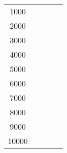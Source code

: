% 
\begin{tabular}{ccccc}
  \hline
  \hline
1000 &  &  &  &  \\ 
  2000 &  &  &  &  \\ 
  3000 &  &  &  &  \\ 
  4000 &  &  &  &  \\ 
  5000 &  &  &  &  \\ 
  6000 &  &  &  &  \\ 
  7000 &  &  &  &  \\ 
  8000 &  &  &  &  \\ 
  9000 &  &  &  &  \\ 
  10000 &  &  &  &  \\ 
   \hline
\end{tabular}
